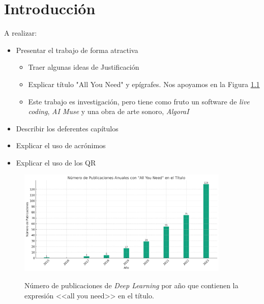 \chapter{Introducción}


A realizar:
\begin{itemize}
    \item Presentar el trabajo de forma atractiva
    \begin{itemize}
        \item Traer algunas ideas de Justificación
        \item Explicar título "All You Need" y epígrafes. Nos apoyamos en la Figura \ref{fig:all_you_need_publicaciones}
        \item Este trabajo es investigación, pero tiene como fruto un software de \textit{live coding}, \textit{AI Muse} y una obra de arte sonoro, \textit{AlgoraI}
    \end{itemize}
    \item Describir los deferentes capítulos
    \item Explicar el uso de acrónimos
    \item Explicar el uso de los QR
\end{itemize}




\begin{figure}[H]
    \caption[Número de publicaciones de \textit{Deep Learning} por año que contienen la expresión <<all you need>> en el título]{Número de publicaciones de \textit{Deep Learning} por año que contienen la expresión <<all you need>> en el título.}
    \centering
    \includegraphics[width=0.9\textwidth]{./figuras/all_you_need_publicacionies_anuales.png}
    \label{fig:all_you_need_publicaciones}
\end{figure}




